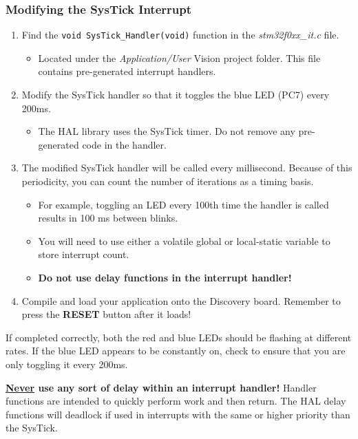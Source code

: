 \documentclass[11pt,fleqn]{book} %
\begin{document}
\begin{exercise}
    \subsubsection{Modifying the SysTick Interrupt}
    \begin{enumerate}
        \item Find the \texttt{void SysTick\_Handler(void)} function in the \textit{stm32f0xx\_it.c} file. 
        \begin{itemize}
            \item Located under the \textit{Application/User} {\textmu}Vision project folder. This file contains pre-generated interrupt handlers. 
        \end{itemize}
        \item Modify the SysTick handler so that it toggles the blue LED (PC7) every 200ms. 
        \begin{itemize}
            \item The HAL library uses the SysTick timer. Do not remove any pre-generated code in the handler.
        \end{itemize}
        \item The modified SysTick handler will be called every millisecond. Because of this periodicity, you can count the number of iterations as a timing basis.
        \begin{itemize}
            \item For example, toggling an LED every 100th time the handler is called results in 100 ms between blinks.
            \item You will need to use either a volatile global or local-static variable to store interrupt count.
            \item \textbf{Do not use delay functions in the interrupt handler!}
        \end{itemize}
    \item Compile and load your application onto the Discovery board. Remember to press the \textbf{RESET} button after it loads!
    \end{enumerate}

     If completed correctly, both the red and blue LEDs should be flashing at different rates. If the blue LED appears to be constantly on, check to ensure that you are only toggling it every 200ms.
\end{exercise}

\begin{warning}
    \textbf{\underline{Never} use any sort of delay within an interrupt handler!} Handler functions are intended to quickly perform work and then return. The HAL delay functions will deadlock if used in interrupts with the same or higher priority than the SysTick.
\end{warning}
\end{document}
